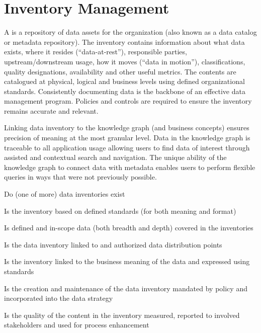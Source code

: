 \section{Inventory Management}\label{sec:ekgmm-b-2-3} %

A  is a repository of data assets for the organization (also known as a
data catalog or metadata repository).
The inventory contains information about what data exists, where it resides (“data-at-rest”),
responsible parties, upstream/downstream usage, how it moves (“data in motion”), classifications,
quality designations, availability and other useful metrics.
The contents are catalogued at physical, logical and business levels using defined organizational standards.
Consistently documenting data is the backbone of an effective data management program.
Policies and controls are required to ensure the inventory remains accurate and relevant.

\kgmmekgrationalesection

Linking data inventory to the knowledge graph (and business concepts) ensures precision of meaning at the most
granular level.
Data in the knowledge graph is traceable to all application usage allowing users to find data of interest through
assisted and contextual search and navigation.
The unique ability of the knowledge graph to connect data with metadata enables users to perform flexible queries
in ways that were not previously possible.

\kgmmcorequestionssection

\begin{core-questions}

  \item [\thesection.1] Do (one of more) data inventories exist
  \item [\thesection.2] Is the inventory based on defined standards (for both meaning and format)
  \item [\thesection.3] Is defined and in-scope data (both breadth and depth) covered in the inventories
  \item [\thesection.4] Is the data inventory linked to  and authorized data distribution points
  \item [\thesection.5] Is the inventory linked to the business meaning of the data and expressed using standards
  \item [\thesection.6] Is the creation and maintenance of the data inventory mandated by policy and incorporated
                        into the data strategy
  \item [\thesection.7] Is the quality of the content in the inventory measured, reported to involved stakeholders
                        and used for process enhancement

\end{core-questions}

